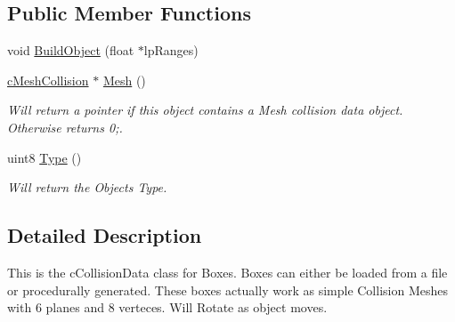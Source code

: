 \subsection*{Public Member Functions}
\begin{DoxyCompactItemize}
\item 
void \hyperlink{classc_mesh_collision_a49a69f58cf68f61f995119c077c26a75}{BuildObject} (float $\ast$lpRanges)
\item 
\hypertarget{classc_mesh_collision_a861e58e0eacea406250fa1eef10c9860}{
\hyperlink{classc_mesh_collision}{cMeshCollision} $\ast$ \hyperlink{classc_mesh_collision_a861e58e0eacea406250fa1eef10c9860}{Mesh} ()}
\label{classc_mesh_collision_a861e58e0eacea406250fa1eef10c9860}

\begin{DoxyCompactList}\small\item\em Will return a pointer if this object contains a Mesh collision data object. Otherwise returns 0;. \end{DoxyCompactList}\item 
\hypertarget{classc_mesh_collision_accad5d32a30bb6fe79df75f1702125fd}{
uint8 \hyperlink{classc_mesh_collision_accad5d32a30bb6fe79df75f1702125fd}{Type} ()}
\label{classc_mesh_collision_accad5d32a30bb6fe79df75f1702125fd}

\begin{DoxyCompactList}\small\item\em Will return the Objects Type. \end{DoxyCompactList}\end{DoxyCompactItemize}


\subsection{Detailed Description}
This is the cCollisionData class for Boxes. Boxes can either be loaded from a file or procedurally generated. These boxes actually work as simple Collision Meshes with 6 planes and 8 verteces. Will Rotate as object moves. 

